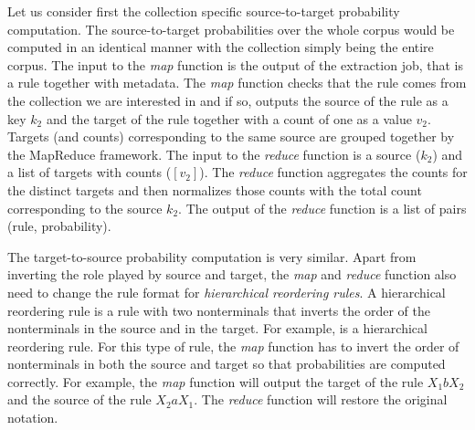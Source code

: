 Let us
consider first the collection specific source-to-target probability computation.
The source-to-target probabilities over the whole corpus would be computed in an identical manner with the
collection simply being the entire corpus. The input to the \emph{map} function
is the output of the extraction job, that is a rule together with metadata.
The \emph{map} function checks that the rule comes from the collection we are
interested in and if so, outputs the source of the rule as a key $k_2$ and the
target of the rule together with a count of one as a value $v_2$. Targets (and
counts) corresponding to the same source are grouped together by the MapReduce
framework. The input to the \emph{reduce} function is a source ($k_2$) and
a list of targets with counts ($[v_2]$). The \emph{reduce} function aggregates
the counts for the distinct targets and then normalizes those counts with the
total count corresponding to the source $k_2$. The output of the \emph{reduce}
function is a list of pairs (rule, probability).

The target-to-source probability computation is very similar. Apart from
inverting the role played by source and target, the \emph{map} and \emph{reduce}
function also need to change the rule format for
\emph{hierarchical reordering rules}.
A hierarchical reordering rule is a rule with two nonterminals that inverts the
order of the nonterminals in the source and in the target. For example,
\RT[$X$][$X_1 a X_2$][$X_2 b X_1$] is a hierarchical reordering rule. For this
type of rule, the \emph{map} function has to invert the order of nonterminals
in both the source and target so that probabilities are computed correctly. For
example, the \emph{map} function will output the target of the rule
$X_1 b X_2$ and the source of the rule $X_2 a X_1$. The \emph{reduce} function
will restore the original notation.

